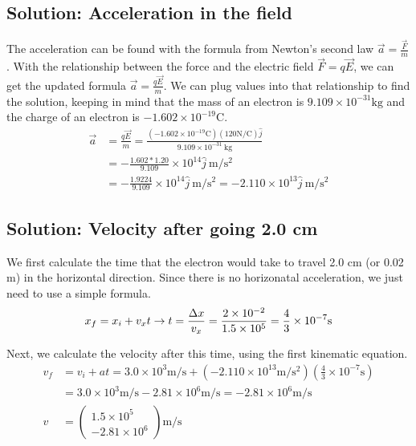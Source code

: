\documentclass[12pt]{article}
\begin{document}
\subsection{Solution: Acceleration in the field}
The acceleration can be found with the formula from Newton's second law \(\vec{a} = \frac{\vec{F}}{m}\).
With the relationship between the force and the electric field \(\vec{F} = q\vec{E}\), we can get the updated formula \(\vec{a} = \frac{q\vec{E}}{m}\). 
We can plug values into that relationship to find the solution, keeping in mind that the mass of an electron is $9.109 \times 10^{-31} \unit{\kilo\gram}$ and the charge of an electron is $-1.602 \times 10^{-19} \unit{\coulomb}$.
\begin{align*}
    \vec{a} &=  \frac{q\vec{E}}{m} = \frac{(-1.602 \times 10^{-19} \unit{\coulomb})(120 \unit{\newton/\coulomb})\hat{j}}{9.109 \times 10^{-31}\ \unit{\kilo\gram}}\\
        &=  -\frac{1.602 * 1.20}{9.109} \times 10^{14}\hat{j}\ \unit{\meter/\second^2}\\
        &=  -\frac{1.9224}{9.109} \times 10^{14}\hat{j}\ \unit{\meter/\second^2}
        =   \boxed{-2.110 \times 10^{13} \hat{j}\ \unit{\meter/\second^2}}
\end{align*}

\subsection{Solution: Velocity after going 2.0 cm}
We first calculate the time that the electron would take to travel 2.0 cm (or 0.02 m) in the horizontal direction. Since there is no horizonatal acceleration, we just need to use a simple formula.
\begin{equation*}
    x_f =   x_i + v_x t\rightarrow\\
    t   =   \frac{\Delta x}{v_x}
        =   \frac{2 \times 10^{-2}}{1.5 \times 10^5}
        =   \frac{4}{3} \times 10^{-7} \unit{\second}
\end{equation*}

Next, we calculate the velocity after this time, using the first kinematic equation. 
\begin{align*}
    v_f &=  v_i + at
        =   3.0 \times 10^3 \unit{\meter/\second} + (-2.110 \times 10^{13} \unit{\meter/\second^2})(\frac{4}{3} \times 10^{-7} \unit{\second})\\
        &=  3.0 \times 10^3 \unit{\meter/\second} - 2.81 \times 10^6 \unit{\meter/\second}
        =   -2.81 \times 10^6 \unit{\meter/\second}\\
    v   &=  \boxed{\left(\begin{matrix} 1.5 \times 10^5 \\ -2.81 \times 10^6 \end{matrix}\right) \unit{\meter/\second}}
\end{align*}
\end{document}
